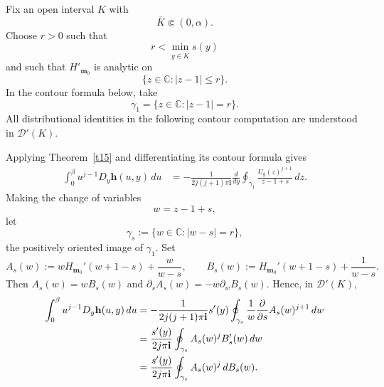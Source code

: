 \documentclass[11pt]{amsart}
\theoremstyle{plain}
\numberwithin{equation}{section}
\numberwithin{theorem}{section}
\numberwithin{figure}{section}
\begin{document}
Fix an open interval $K$ with
\[
    \overline K\Subset(0,\alpha).
\]
Choose $r>0$ such that
\[
    r<\min_{y\in\overline K}s(y)
\]
and such that $H'_{\mathbf m_0}$ is analytic on
\[
    \{z\in\mathbb C:|z-1|\leq r\}.
\]
In the contour formula below, take
\[
    \gamma_1=\{z\in\mathbb C:|z-1|=r\}.
\]
All distributional identities in the following contour computation are
understood in $\mathcal D'(K)$.

Applying Theorem~\ref{t15} and differentiating its contour formula gives
\begin{align*}
\int_0^\beta
u^{j-1}D_y\mathbf h(u,y)\,du
&=
-\frac{1}{2j(j+1)\pi\mathbf i}
\frac{d}{dy}
\oint_{\gamma_1}
\frac{U_y(z)^{j+1}}{z-1+s}
\,dz.
\end{align*}
Making the change of variables
\[
    w=z-1+s,
\]
let
\[
    \gamma_s:=\{w\in\mathbb C:|w-s|=r\},
\]
the positively oriented image of $\gamma_1$. Set
\[
    A_s(w):=wH_{\mathbf m_0}'(w+1-s)+\frac{w}{w-s},
    \qquad
    B_s(w):=H_{\mathbf m_0}'(w+1-s)+\frac{1}{w-s}.
\]
Then $A_s(w)=wB_s(w)$ and
$\partial_sA_s(w)=-w\partial_wB_s(w)$. Hence, in
$\mathcal D'(K)$,
\begin{align}
\int_0^\beta
u^{j-1}D_y\mathbf h(u,y)\,du
&=
-\frac{1}{2j(j+1)\pi\mathbf i}
s'(y)
\oint_{\gamma_s}
\frac{1}{w}
\frac{\partial}{\partial s}A_s(w)^{j+1}
\,dw\notag\\
&=
\frac{s'(y)}{2j\pi\mathbf i}
\oint_{\gamma_s}A_s(w)^jB_s'(w)\,dw\notag\\
&=
\frac{s'(y)}{2j\pi\mathbf i}
\oint_{\gamma_s}A_s(w)^j\,dB_s(w).
\label{eq:weak-vertical-contour-moments}
\end{align}
\end{document}
